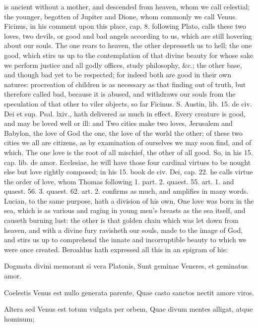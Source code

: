 {is ancient without a mother, and descended from heaven, whom we call
celestial; the younger, begotten of Jupiter and Dione, whom commonly we
call Venus. Ficinus, in his comment upon this place, cap. 8. following
Plato, calls these two loves, two devils, or good and bad angels
according to us, which are still hovering about our souls. The
one rears to heaven, the other depresseth us to hell; the one good,
which stirs us up to the contemplation of that divine beauty for whose
sake we perform justice and all godly offices, study philosophy, \&c.;
the other base, and though bad yet to be respected; for indeed both are
good in their own natures: procreation of children is as necessary as
that finding out of truth, but therefore called bad, because it is
abused, and withdraws our souls from the speculation of that other to
viler objects, so far Ficinus. S. Austin, lib. 15. de civ. Dei et sup.
Psal. lxiv., hath delivered as much in effect. Every creature is
good, and may be loved well or ill: and Two cities make two
loves, Jerusalem and Babylon, the love of God the one, the love of the
world the other; of these two cities we all are citizens, as by
examination of ourselves we may soon find, and of which. The one love
is the root of all mischief, the other of all good. So, in his 15. cap.
lib. de amor. Ecclesiae, he will have those four cardinal virtues to be
nought else but love rightly composed; in his 15. book de civ. Dei,
cap. 22. he calls virtue the order of love, whom Thomas following 1.
part. 2. quaest. 55. art. 1. and quaest. 56. 3. quaest. 62. art. 2.
confirms as much, and amplifies in many words. Lucian, to the
same purpose, hath a division of his own, One love was born in the sea,
which is as various and raging in young men's breasts as the sea
itself, and causeth burning lust: the other is that golden chain which
was let down from heaven, and with a divine fury ravisheth our souls,
made to the image of God, and stirs us up to comprehend the innate and
incorruptible beauty to which we were once created. Beroaldus hath
expressed all this in an epigram of his:

Dogmata divini memorant si vera Platonis,
Sunt geminae Veneres, et geminatus amor.

Coelestis Venus est nullo generata parente,
Quae casto sanctos nectit amore viros.

Altera sed Venus est totum vulgata per orbem,
Quae divum mentes alligat, atque hominum;

}
